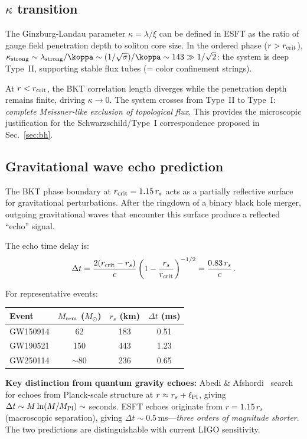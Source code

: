 ﻿\documentclass[twocolumn,preprintnumbers,amsmath,amssymb,prd]{revtex4-2}
\begin{document}
\subsection{$\kappa$ transition}

The Ginzburg-Landau parameter $\kappa = \lambda/\xi$ can be defined in ESFT as the ratio of gauge field penetration depth to soliton core size. In the ordered phase ($r > r_{\rm crit}$), $\kappa_{\rm strong} \sim \lambda_{\rm strong}/\koppa \sim (1/\sqrt{\sigma})/\koppa \sim 143 \gg 1/\sqrt{2}$: the system is deep Type~II, supporting stable flux tubes (= color confinement strings).

At $r < r_{\rm crit}$, the BKT correlation length diverges while the penetration depth remains finite, driving $\kappa \to 0$. The system crosses from Type~II to Type~I: \emph{complete Meissner-like exclusion of topological flux}. This provides the microscopic justification for the Schwarzschild/Type~I correspondence proposed in Sec.~\ref{sec:bh}.

\subsection{Gravitational wave echo prediction}

The BKT phase boundary at $r_{\rm crit} = 1.15\,r_s$ acts as a partially reflective surface for gravitational perturbations. After the ringdown of a binary black hole merger, outgoing gravitational waves that encounter this surface produce a reflected ``echo'' signal.

The echo time delay is:
\begin{equation}
\Delta t = \frac{2(r_{\rm crit} - r_s)}{c}\left(1 - \frac{r_s}{r_{\rm crit}}\right)^{-1/2} = \frac{0.83\,r_s}{c}\,.
\label{eq:echo_delay}
\end{equation}

For representative events:
\begin{center}
\begin{tabular}{lccc}
\toprule
Event & $M_{\rm rem}$ ($M_\odot$) & $r_s$ (km) & $\Delta t$ (ms) \\
\midrule
GW150914 & 62 & 183 & 0.51 \\
GW190521 & 150 & 443 & 1.23 \\
GW250114 & $\sim$80 & 236 & 0.65 \\
\bottomrule
\end{tabular}
\end{center}

\textbf{Key distinction from quantum gravity echoes:} Abedi \& Afshordi~\cite{Abedi2017} search for echoes from Planck-scale structure at $r \approx r_s + \ell_{\rm Pl}$, giving $\Delta t \sim M\ln(M/M_{\rm Pl}) \sim$ seconds. ESFT echoes originate from $r = 1.15\,r_s$ (macroscopic separation), giving $\Delta t \sim 0.5\,$ms---\emph{three orders of magnitude shorter}. The two predictions are distinguishable with current LIGO sensitivity.
\end{document}
